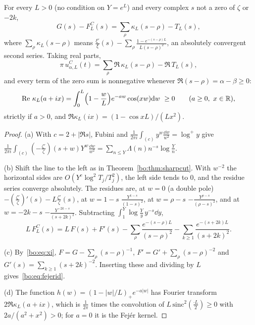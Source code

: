 \begin{theorem}\label{bo:thm:cesaro}
For every $L>0$ (no condition on $Y=e^L$) and every complex $s$ not a zero of $\zeta$ or $-2k$,
\begin{equation}\label{bo:eq:fejerid}
G(s)-F^C_L(s)=\sum_\rho\kappa_L(s-\rho)-T_L(s),
\end{equation}
where $\sum_\rho\kappa_L(s-\rho)$ means $\frac{\xi'}{\xi}(s)-\sum_\rho\frac{1-e^{-(s-\rho)L}}{L(s-\rho)^2}$, an absolutely convergent second series. Taking real parts,
\begin{equation}\label{bo:eq:fejerre}
\pi\,u^C_{\alpha,L}(t)=\sum_\rho\Re\,\kappa_L(s-\rho)-\Re\,T_L(s),
\end{equation}
and every term of the zero sum is nonnegative whenever $\Re(s-\rho)=\alpha-\beta\ge0$:
\[
\operatorname{Re}\,\kappa_L(a+ix)=\int_0^L\Bigl(1-\frac wL\Bigr)e^{-aw}\cos(xw)\mathrm{d} w\ \ge0\qquad(a\ge0,\ x\in\mathbb R),
\]
strictly if $a>0$, and $\Re\kappa_L(ix)=(1-\cos xL)/(Lx^2)$.
\end{theorem}

\begin{proof}
(a) With $c=2+|\Re s|$, Fubini and $\frac1{2\pi i}\int_{(c)}y^w\frac{\dd w}{w^2}=\log^+y$ give $\frac1{2\pi i}\int_{(c)}(-\frac{\zeta'}{\zeta})(s+w)Y^w\frac{\dd w}{w^2}=\sum_{n\le Y}\Lambda(n)n^{-s}\log\frac Yn$.

(b) Shift the line to the left as in Theorem~\ref{bo:thm:sharpcut}. With $w^{-2}$ the horizontal sides are $O(Y^c\log^2T_j/T_j^2)$, the left side tends to $0$, and the residue series converge absolutely. The residues are, at $w=0$ (a double pole) $-(\frac{\zeta'}{\zeta})'(s)-L\frac{\zeta'}{\zeta}(s)$, at $w=1-s$ $\frac{Y^{1-s}}{(1-s)^2}$, at $w=\rho-s$ $-\frac{Y^{\rho-s}}{(\rho-s)^2}$, and at $w=-2k-s$ $-\frac{Y^{-2k-s}}{(s+2k)^2}$. Subtracting $\int_1^Y\log\frac Yy\,y^{-s}\dd y$,
\[
L\,F^C_L(s)=L\,F(s)+F'(s)-\sum_\rho\frac{e^{-(s-\rho)L}}{(s-\rho)^2}-\sum_{k\ge1}\frac{e^{-(s+2k)L}}{(s+2k)^2}.
\]

(c) By~\eqref{bo:eq:xi}, $F=G-\sum_\rho(s-\rho)^{-1}$, $F'=G'+\sum_\rho(s-\rho)^{-2}$ and $G'(s)=\sum_{k\ge1}(s+2k)^{-2}$. Inserting these and dividing by $L$ gives~\eqref{bo:eq:fejerid}.

(d) The function $h(w)=(1-|w|/L)_+e^{-a|w|}$ has Fourier transform $2\Re\kappa_L(a+ix)$, which is $\frac1{2\pi}$ times the convolution of $L\,\mathrm{sinc}^2(\frac{\cdot L}2)\ge0$ with $2a/(a^2+x^2)>0$; for $a=0$ it is the Fej\'er kernel.
\end{proof}


